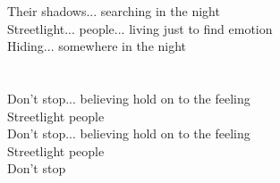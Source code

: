Their shadows... searching in the night\\
Streetlight... people...  living just to find emotion\\
Hiding... somewhere in the night\\
   \\
   \\
Don’t stop... believing  hold on to the feeling\\
Streetlight people  \\
Don’t stop... believing  hold on to the feeling\\
Streetlight people  \\
Don’t stop

